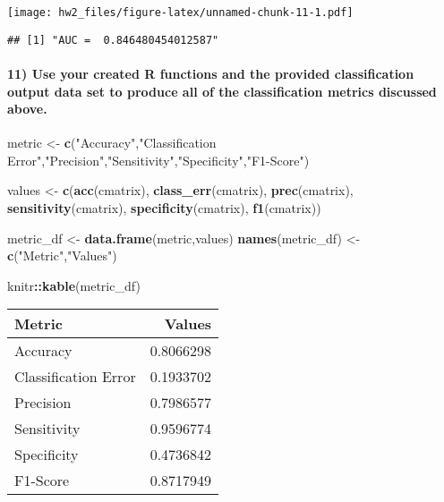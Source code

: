 \documentclass[]{article}
\newenvironment{Shaded}{\begin{snugshade}}{\end{snugshade}}
\newcommand{\KeywordTok}[1]{\textcolor[rgb]{0.13,0.29,0.53}{\textbf{#1}}}
\newcommand{\StringTok}[1]{\textcolor[rgb]{0.31,0.60,0.02}{#1}}
\newcommand{\OperatorTok}[1]{\textcolor[rgb]{0.81,0.36,0.00}{\textbf{#1}}}
\newcommand{\NormalTok}[1]{#1}
\let\oldparagraph\paragraph
\renewcommand{\paragraph}[1]{\oldparagraph{#1}\mbox{}}
\begin{document}
\texttt{[image: hw2\_files/figure-latex/unnamed-chunk-11-1.pdf]}

\begin{verbatim}
## [1] "AUC =  0.846480454012587"
\end{verbatim}

\paragraph{11) Use your created R functions and the provided
classification output data set to produce all of the classification
metrics discussed
above.}\label{use-your-created-r-functions-and-the-provided-classification-output-data-set-to-produce-all-of-the-classification-metrics-discussed-above.}

\begin{Shaded}
\begin{Highlighting}[]
\NormalTok{metric <-}\StringTok{ }\KeywordTok{c}\NormalTok{(}\StringTok{"Accuracy"}\NormalTok{,}\StringTok{"Classification Error"}\NormalTok{,}\StringTok{"Precision"}\NormalTok{,}\StringTok{"Sensitivity"}\NormalTok{,}\StringTok{"Specificity"}\NormalTok{,}\StringTok{"F1-Score"}\NormalTok{)}

\NormalTok{values <-}\StringTok{ }\KeywordTok{c}\NormalTok{(}\KeywordTok{acc}\NormalTok{(cmatrix),}
            \KeywordTok{class_err}\NormalTok{(cmatrix),}
            \KeywordTok{prec}\NormalTok{(cmatrix),}
            \KeywordTok{sensitivity}\NormalTok{(cmatrix),}
            \KeywordTok{specificity}\NormalTok{(cmatrix),}
            \KeywordTok{f1}\NormalTok{(cmatrix))}

\NormalTok{metric_df <-}\StringTok{ }\KeywordTok{data.frame}\NormalTok{(metric,values)}
\KeywordTok{names}\NormalTok{(metric_df) <-}\StringTok{ }\KeywordTok{c}\NormalTok{(}\StringTok{"Metric"}\NormalTok{,}\StringTok{"Values"}\NormalTok{)}

\NormalTok{knitr}\OperatorTok{::}\KeywordTok{kable}\NormalTok{(metric_df)}
\end{Highlighting}
\end{Shaded}

\begin{longtable}[]{@{}lr@{}}
\toprule
Metric & Values\tabularnewline
\midrule
\endhead
Accuracy & 0.8066298\tabularnewline
Classification Error & 0.1933702\tabularnewline
Precision & 0.7986577\tabularnewline
Sensitivity & 0.9596774\tabularnewline
Specificity & 0.4736842\tabularnewline
F1-Score & 0.8717949\tabularnewline
\bottomrule
\end{longtable}
\end{document}
